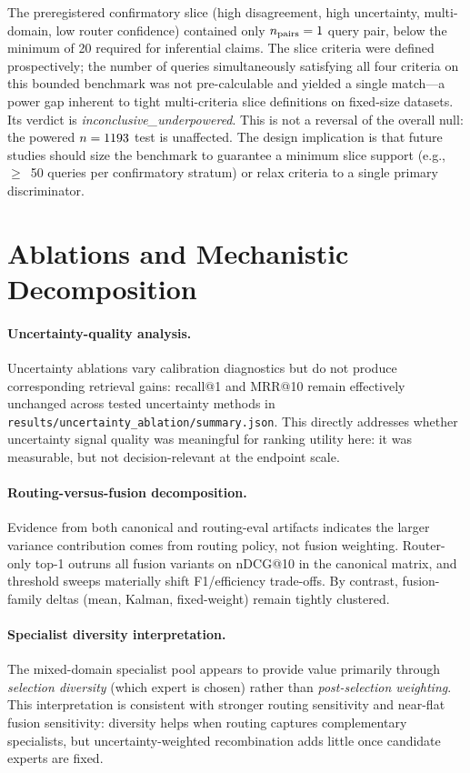 \documentclass[10pt]{article}
\begin{document}
The preregistered confirmatory slice (high disagreement, high uncertainty, multi-domain, low router confidence) contained only $n_{\text{pairs}}=1$ query pair, below the minimum of 20 required for inferential claims. The slice criteria were defined prospectively; the number of queries simultaneously satisfying all four criteria on this bounded benchmark was not pre-calculable and yielded a single match---a power gap inherent to tight multi-criteria slice definitions on fixed-size datasets. Its verdict is \emph{inconclusive\_underpowered}. This is not a reversal of the overall null: the powered $n=1193$ test is unaffected. The design implication is that future studies should size the benchmark to guarantee a minimum slice support (e.g., $\ge$~50 queries per confirmatory stratum) or relax criteria to a single primary discriminator.

\section{Ablations and Mechanistic Decomposition}


\paragraph{Uncertainty-quality analysis.}
Uncertainty ablations vary calibration diagnostics but do not produce corresponding retrieval gains: recall@1 and MRR@10 remain effectively unchanged across tested uncertainty methods in \texttt{results/uncertainty\_ablation/summary.json}. This directly addresses whether uncertainty signal quality was meaningful for ranking utility here: it was measurable, but not decision-relevant at the endpoint scale.

\paragraph{Routing-versus-fusion decomposition.}
Evidence from both canonical and routing-eval artifacts indicates the larger variance contribution comes from routing policy, not fusion weighting. Router-only top-1 outruns all fusion variants on nDCG@10 in the canonical matrix, and threshold sweeps materially shift F1/efficiency trade-offs. By contrast, fusion-family deltas (mean, Kalman, fixed-weight) remain tightly clustered.

\paragraph{Specialist diversity interpretation.}
The mixed-domain specialist pool appears to provide value primarily through \emph{selection diversity} (which expert is chosen) rather than \emph{post-selection weighting}. This interpretation is consistent with stronger routing sensitivity and near-flat fusion sensitivity: diversity helps when routing captures complementary specialists, but uncertainty-weighted recombination adds little once candidate experts are fixed.
\end{document}
